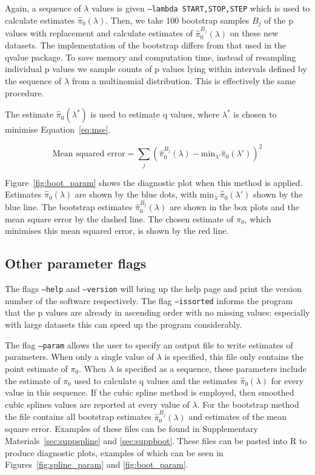 \documentclass{amsart}
\begin{document}
Again, a sequence of $\lambda$ values is given \texttt{--lambda START,STOP,STEP} which is used to calculate estimates $\hat{\pi}_0(\lambda)$. Then, we take 100 bootstrap samples $B_j$ of the p values with replacement and calculate estimates of  $\hat{\pi}^{B_j}_0(\lambda)$ on these new datasets. The implementation of the bootstrap differs from that used in the qvalue package. To save memory and computation time, instead of resampling individual p values we sample counts of p values lying within intervals defined by the sequence of $\lambda$ from a multinomial distribution. This is effectively the same procedure.

The estimate $\hat{\pi}_0(\lambda^*)$ is used to estimate q values,  where $\lambda^*$ is chosen to minimise Equation~\ref{eq:mse}.

\begin{equation}
\text{Mean squared error} = \sum_j (\hat{\pi}^{B_j}_0(\lambda) - \text{min}_{\lambda'}\hat{\pi}_0(\lambda'))^2\label{eq:mse}
\end{equation}

Figure~\ref{fig:boot_param} shows the diagnostic plot when this method is applied. Estimates $\hat{\pi}_0(\lambda)$ are shown by the blue dots, with $\text{min}_{\lambda'}\hat{\pi}_0(\lambda')$ shown by the blue line. The bootstrap estimates $\hat{\pi}^{B_j}_0(\lambda)$ are shown in the box plots and the mean square error by the dashed line. The chosen estimate of $\pi_0$, which minimises this mean squared error, is shown by the red line.

\subsection{Other parameter flags}

The flags \texttt{--help} and \texttt{--version} will bring up the help page and print the version number of the software respectively. The flag \texttt{--issorted} informs the program that the p values are already in ascending order with no missing values: especially with large datasets this can speed up the program considerably.

The flag \texttt{--param} allows the user to specify an output file to write estimates of parameters. When only a single value of $\lambda$ is specified, this file only contains the point estimate of $\pi_0$. When $\lambda$ is specified as a sequence, these parameters include the estimate of $\pi_0$ used to calculate q values and the estimates $\hat{\pi}_0(\lambda)$ for every value in this sequence. If the cubic spline method is employed, then smoothed cubic splines values are reported at every value of $\lambda$. For the bootstrap method the file contains all bootstrap estimates $\hat{\pi}^{B_j}_0(\lambda)$ and estimates of the mean square error. Examples of these files can be found in Supplementary Materials~\ref{sec:suppspline} and \ref{sec:suppboot}. These files can be pasted into R to produce diagnostic plots, examples of which can be seen in Figures~\ref{fig:spline_param} and \ref{fig:boot_param}.
\end{document}

